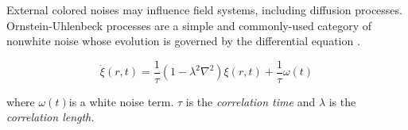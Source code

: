 External colored noises may influence field systems, including diffusion
processes. Ornstein-Uhlenbeck processes are a simple and commonly-used
category of nonwhite noise whose evolution is governed by the
differential equation \cite{ojalvoColoredNoise}.

\[\dot{\xi}(r,t) = \frac{1}{\tau}(1 - \lambda^{2}\nabla^{2})\xi(r,t) + \frac{1}{\tau}\omega(t)\]

where \(\omega(t)\)is a white noise term. \(\tau\) is the
\emph{correlation time} and \(\lambda\) is the \emph{correlation length.} 